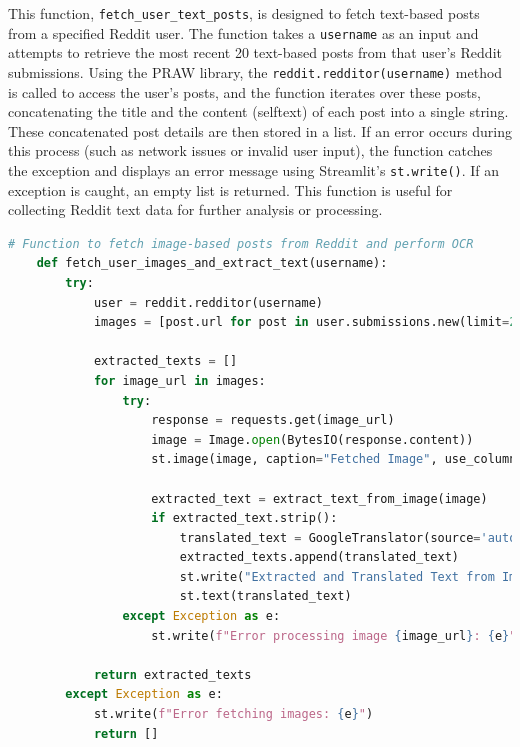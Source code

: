 \noindent
This function, \texttt{fetch\_user\_text\_posts}, is designed to fetch text-based posts from a specified Reddit user. The function takes a \texttt{username} as an input and attempts to retrieve the most recent 20 text-based posts from that user’s Reddit submissions. Using the PRAW library, the \texttt{reddit.redditor(username)} method is called to access the user’s posts, and the function iterates over these posts, concatenating the title and the content (selftext) of each post into a single string. These concatenated post details are then stored in a list. If an error occurs during this process (such as network issues or invalid user input), the function catches the exception and displays an error message using Streamlit’s \texttt{st.write()}. If an exception is caught, an empty list is returned. This function is useful for collecting Reddit text data for further analysis or processing.


\begin{tcolorbox}[colback=gray!5!white, colframe=gray!80!black, boxrule=0.5pt, title=Fetching Image-Based Posts from Reddit and Performing OCR]
    \begin{lstlisting}[language=Python]
    # Function to fetch image-based posts from Reddit and perform OCR
    def fetch_user_images_and_extract_text(username):
        try:
            user = reddit.redditor(username)
            images = [post.url for post in user.submissions.new(limit=20) if post.url.endswith(('.jpg', '.jpeg', '.png', '.webp', '.bmp', '.tiff'))]

            extracted_texts = []
            for image_url in images:
                try:
                    response = requests.get(image_url)
                    image = Image.open(BytesIO(response.content))
                    st.image(image, caption="Fetched Image", use_column_width=True)

                    extracted_text = extract_text_from_image(image)
                    if extracted_text.strip():
                        translated_text = GoogleTranslator(source='auto', target='en').translate(extracted_text)
                        extracted_texts.append(translated_text)
                        st.write("Extracted and Translated Text from Image:")
                        st.text(translated_text)
                except Exception as e:
                    st.write(f"Error processing image {image_url}: {e}")

            return extracted_texts
        except Exception as e:
            st.write(f"Error fetching images: {e}")
            return []
    \end{lstlisting}
\end{tcolorbox}

